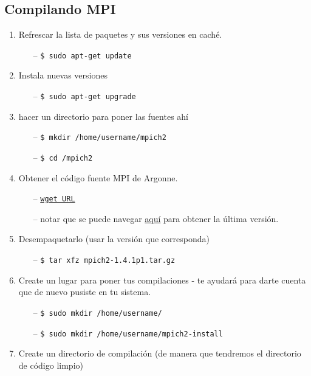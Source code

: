 \documentclass[conference]{IEEEtran}
\begin{document}
\subsection{Compilando MPI}
\begin{enumerate}
\item Refrescar la lista de paquetes y sus versiones en caché.
  \begin{itemize}
  \item[--] \texttt{\$ sudo apt-get update}
  \end{itemize}
\item Instala nuevas versiones
  \begin{itemize}
  \item[--] \texttt{\$ sudo apt-get upgrade}
  \end{itemize}
\item hacer un directorio para poner las fuentes ahí
  \begin{itemize}
  \item[--] \texttt{\$ mkdir /home/username/mpich2}
  \item[--] \texttt{\$ cd \texttildelow/mpich2}
  \end{itemize}
\item Obtener el código fuente MPI de Argonne.
  \begin{itemize}
  \item[--] \texttt{\href{http://www.mcs.anl.gov/research/projects/mpich2/downloads/tarballs/1.4.1p1/mpich2-1.4.1p1.tar.gz}{wget URL}}
  \item[--] notar que se puede navegar \href{http://www.mpich.org/downloads/}{aquí} para
obtener la última versión.
  \end{itemize}
\item Desempaquetarlo (usar la versión que corresponda)
  \begin{itemize}
  \item[--] \texttt{\$ tar xfz mpich2-1.4.1p1.tar.gz}
  \end{itemize}
\item Create un lugar para poner tus compilaciones - te ayudará para darte cuenta que de nuevo
pusiste en tu sistema.
  \begin{itemize}
  \item[--] \texttt{\$ sudo mkdir /home/username/}
  \item[--] \texttt{\$ sudo mkdir /home/username/mpich2-install}
  \end{itemize}
\item Create un directorio de compilación (de manera que tendremos el directorio de código limpio)

\end{enumerate}
\end{document}
